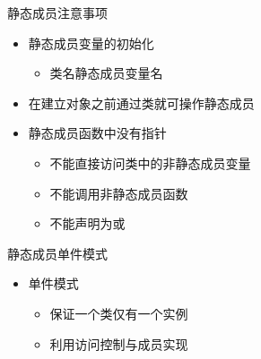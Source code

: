 \begin{frame}[t, fragile]{静态成员}{注意事项}%
  \stretchon
  \begin{itemize}
  \item 静态成员变量的初始化
    \begin{itemize}
    \item 类名\cppinttfts{::}静态成员变量名
    \end{itemize}    
  \item 在建立对象之前通过类就可操作静态成员
  \item 静态成员函数中\alert{没有指针}
    \begin{itemize}
    \item 不能直接访问类中的非静态成员变量
    \item 不能调用非静态成员函数
    \item 不能声明为或
    \end{itemize}    
  \end{itemize}
  \stretchoff
\end{frame}

\begin{frame}[t, fragile]{静态成员}{单件模式}%
  \begin{itemize}
  \item 单件模式
    \begin{itemize}
    \item 保证一个类仅有一个实例
    \item 利用访问控制与成员实现
    \end{itemize}       
  \end{itemize}
  \begin{center}
    \begin{minipage}{0.45\linewidth}
    \end{minipage}
    \begin{minipage}{0.45\linewidth}
    \end{minipage}
  \end{center}
\end{frame}

